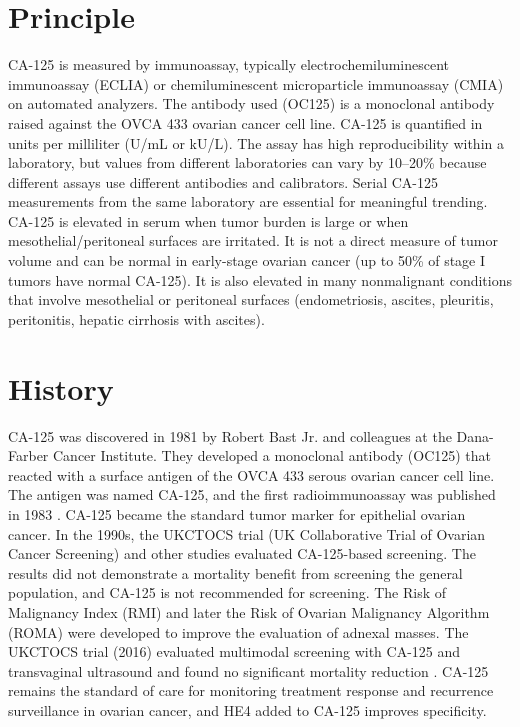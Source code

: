 \section*{Principle}
CA-125 is measured by immunoassay, typically electrochemiluminescent immunoassay (ECLIA) or chemiluminescent microparticle immunoassay (CMIA) on automated analyzers. The antibody used (OC125) is a monoclonal antibody raised against the OVCA 433 ovarian cancer cell line. CA-125 is quantified in units per milliliter (U/mL or kU/L). The assay has high reproducibility within a laboratory, but values from different laboratories can vary by 10--20\% because different assays use different antibodies and calibrators. Serial CA-125 measurements from the same laboratory are essential for meaningful trending. CA-125 is elevated in serum when tumor burden is large or when mesothelial/peritoneal surfaces are irritated. It is not a direct measure of tumor volume and can be normal in early-stage ovarian cancer (up to 50\% of stage I tumors have normal CA-125). It is also elevated in many nonmalignant conditions that involve mesothelial or peritoneal surfaces (endometriosis, ascites, pleuritis, peritonitis, hepatic cirrhosis with ascites).

\section*{History}
CA-125 was discovered in 1981 by Robert Bast Jr. and colleagues at the Dana-Farber Cancer Institute. They developed a monoclonal antibody (OC125) that reacted with a surface antigen of the OVCA 433 serous ovarian cancer cell line. The antigen was named CA-125, and the first radioimmunoassay was published in 1983 \cite{bast1981reactivity}\cite{bast1983radioimmunoassay}. CA-125 became the standard tumor marker for epithelial ovarian cancer. In the 1990s, the UKCTOCS trial (UK Collaborative Trial of Ovarian Cancer Screening) and other studies evaluated CA-125-based screening. The results did not demonstrate a mortality benefit from screening the general population, and CA-125 is not recommended for screening. The Risk of Malignancy Index (RMI) and later the Risk of Ovarian Malignancy Algorithm (ROMA) were developed to improve the evaluation of adnexal masses. The UKCTOCS trial (2016) evaluated multimodal screening with CA-125 and transvaginal ultrasound and found no significant mortality reduction \cite{jacobs2016ovarian}. CA-125 remains the standard of care for monitoring treatment response and recurrence surveillance in ovarian cancer, and HE4 added to CA-125 improves specificity.

